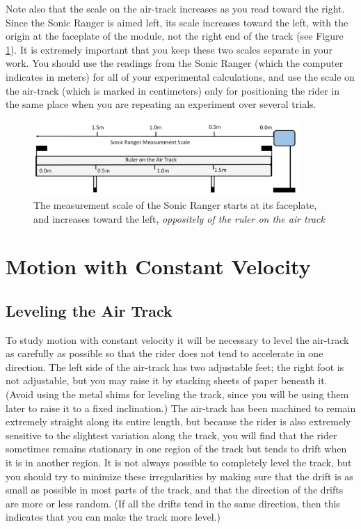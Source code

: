 Note also that the scale on the air-track increases as you read toward the right.  Since the Sonic Ranger is aimed left, its scale increases toward the left, with the origin at the faceplate of the module, not the right end of the track (see Figure \ref{fig:measurement}).  It is extremely important that you keep these two scales separate in your work.  You should use the readings from the Sonic Ranger (which the computer indicates in meters) for all of your experimental calculations, and use the scale on the air-track (which is marked in centimeters) only for positioning the rider in the same place when you are repeating an experiment over several trials.
\begin{figure}[h]
    \begin{center}
        \includegraphics[width=0.9\textwidth]{./Exp1-3/pic/image12.jpg}
    \end{center}
    \caption{The measurement scale of the Sonic Ranger starts at its faceplate, and increases toward the left, \emph{oppositely of the ruler on the air track}}
    \label{fig:measurement}
\end{figure}

\section{Motion with Constant Velocity}

\subsection{Leveling the Air Track}

To study motion with constant velocity it will be necessary to level the air-track as carefully as possible so that the rider does not tend to accelerate in one direction.  The left side of the air-track has two adjustable feet; the right foot is not adjustable, but you may raise it by stacking sheets of paper beneath it.  (Avoid using the metal shims for leveling the track, since you will be using them later to raise it to a fixed inclination.)  The air-track has been machined to remain extremely straight along its entire length, but because the rider is also extremely sensitive to the slightest variation along the track, you will find that the rider sometimes remains stationary in one region of the track but tends to drift when it is in another region.  It is not always possible to completely level the track, but you should try to minimize these irregularities by making sure that the drift is as small as possible in most parts of the track, and that the direction of the drifts are more or less random.  (If all the drifts tend in the same direction, then this indicates that you can make the track more level.)

